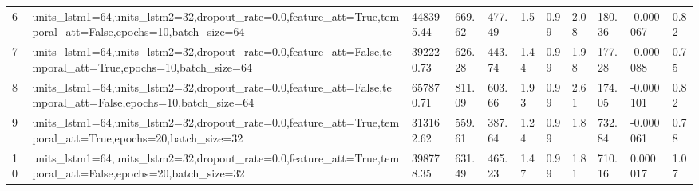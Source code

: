 \begin{longtable}{C{0.8cm} L{2cm} C{1.15cm} C{1.15cm} C{1.15cm} C{1.15cm} C{0.85cm} C{1.25cm} C{1.2cm} C{1.5cm} C{1.0cm}}
6 & units\_lstm1=64,\newline units\_lstm2=32,\newline dropout\_rate=0.0,\newline feature\_att=True,\newline temporal\_att=False,\newline epochs=10,\newline batch\_size=64 & 448395.44 & 669.62 & 477.49 & 1.5 & 0.99 & 2.08 & 180.36 & -0.000067 & 0.82 \\
7 & units\_lstm1=64,\newline units\_lstm2=32,\newline dropout\_rate=0.0,\newline feature\_att=False,\newline temporal\_att=True,\newline epochs=10,\newline batch\_size=64 & 392220.73 & 626.28 & 443.74 & 1.44 & 0.99 & 1.98 & 177.28 & -0.000088 & 0.75 \\
8 & units\_lstm1=64,\newline units\_lstm2=32,\newline dropout\_rate=0.0,\newline feature\_att=False,\newline temporal\_att=False,\newline epochs=10,\newline batch\_size=64 & 657870.71 & 811.09 & 603.66 & 1.93 & 0.99 & 2.61 & 174.05 & -0.000101 & 0.82 \\
9 & units\_lstm1=64,\newline units\_lstm2=32,\newline dropout\_rate=0.0,\newline feature\_att=True,\newline temporal\_att=True,\newline epochs=20,\newline batch\_size=32 & 313162.62 & 559.61 & 387.64 & 1.24 & 0.99 & 1.8 & 732.84 & -0.000061 & 0.78 \\
10 & units\_lstm1=64,\newline units\_lstm2=32,\newline dropout\_rate=0.0,\newline feature\_att=True,\newline temporal\_att=False,\newline epochs=20,\newline batch\_size=32 & 398778.35 & 631.49 & 465.23 & 1.47 & 0.99 & 1.81 & 710.16 & 0.000017 & 1.07 \\

\end{longtable}
